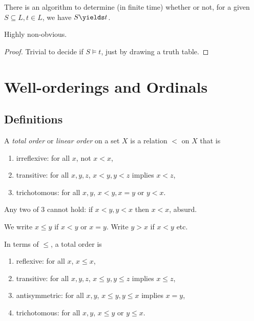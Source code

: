 \documentclass[a4paper]{article}
\begin{document}
\begin{corollary}
  There is an algorithm to determine (in finite time) whether or not, for a given \(S \subseteq L, t\in L\), we have \(S \yields t\).
\end{corollary}

\begin{remark}
  Highly non-obvious.
\end{remark}

\begin{proof}
  Trivial to decide if \(S \models t\), just by drawing a truth table.
\end{proof}

\section{Well-orderings and Ordinals}

\subsection{Definitions}

\begin{definition}
  A \emph{total order} or \emph{linear order} on a set \(X\) is a relation \(<\) on \(X\) that is
  \begin{enumerate}
  \item irreflexive: for all \(x\), not \(x < x\),
  \item transitive: for all \(x, y, z\), \(x < y, y < z\) implies \(x < z\),
  \item trichotomous: for all  \(x, y\), \(x < y, x = y\) or \(y < x\).
  \end{enumerate}
\end{definition}

\begin{note}
  Any two of 3 cannot hold: if \(x < y, y < x\) then \(x < x\), absurd.
\end{note}

\begin{notation}
  We write \(x \leq y\) if \(x < y\) or \(x = y\). Write \(y > x\) if \(x < y\) etc.

  In terms of \(\leq\), a total order is
  \begin{enumerate}
  \item reflexive: for all \(x\), \(x \leq x\),
  \item transitive: for all \(x, y, z\), \(x \leq y, y \leq z\) implies \(x \leq z\),
  \item antisymmetric: for all \(x, y\), \(x \leq y, y \leq x\) implies \(x = y\),
  \item trichotomous: for all \(x, y\), \(x \leq y\) or \(y \leq x\).
  \end{enumerate}
\end{notation}
\end{document}

